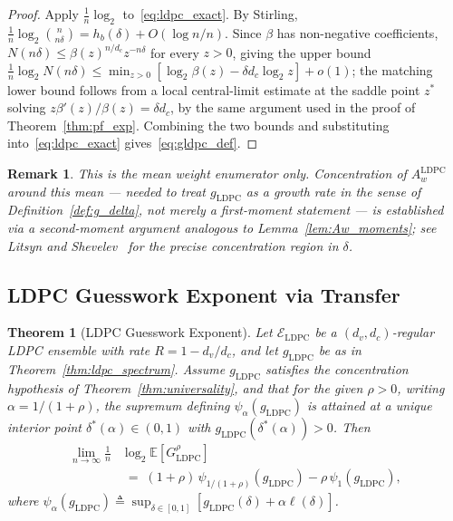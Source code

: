 \documentclass[journal,10pt,onecolumn]{IEEEtran}
\newtheorem{theorem}{Theorem}
\newtheorem{remark}{Remark}
\newcommand{\Eb}{\mathbb{E}}
\newcommand{\Hb}{h_b}
\begin{document}
\begin{proof}
Apply $\frac1n\log_2$ to~\eqref{eq:ldpc_exact}. By Stirling,
$\frac1n\log_2\binom{n}{n\delta}=\Hb(\delta)+O(\log n/n)$.
Since $\beta$ has non-negative coefficients, $N(n\delta)\le\beta(z)^{n/d_c}z^{-n\delta}$
for every $z>0$, giving the upper bound
$\frac1n\log_2 N(n\delta)\le\min_{z>0}[\log_2\beta(z)-\delta d_c\log_2 z]+o(1)$;
the matching lower bound follows from a local central-limit estimate at the
saddle point $z^*$ solving $z\beta'(z)/\beta(z)=\delta d_c$, by the same
argument used in the proof of Theorem~\ref{thm:pf_exp}. Combining the two
bounds and substituting into~\eqref{eq:ldpc_exact} gives~\eqref{eq:gldpc_def}.
\end{proof}

\begin{remark}
This is the mean weight enumerator only. Concentration of $A_w^{\mathrm{LDPC}}$
around this mean — needed to treat $g_{\mathrm{LDPC}}$ as a growth rate in the
sense of Definition~\ref{def:g_delta}, not merely a first-moment statement —
is established via a second-moment argument analogous to
Lemma~\ref{lem:Aw_moments}; see Litsyn and Shevelev~\cite{litsyn2002ensembles}
for the precise concentration region in $\delta$.
\end{remark}

\subsection{LDPC Guesswork Exponent via Transfer}

\begin{theorem}[LDPC Guesswork Exponent]
\label{thm:ldpc_guesswork}
Let $\mathcal{E}_{\mathrm{LDPC}}$ be a $(d_v,d_c)$-regular LDPC ensemble with
rate $R=1-d_v/d_c$, and let $g_{\mathrm{LDPC}}$ be as in
Theorem~\ref{thm:ldpc_spectrum}. Assume $g_{\mathrm{LDPC}}$ satisfies the
concentration hypothesis of Theorem~\ref{thm:universality}, and that for the
given $\rho>0$, writing $\alpha=1/(1+\rho)$, the supremum defining
$\psi_\alpha(g_{\mathrm{LDPC}})$ is attained at a unique interior point
$\delta^*(\alpha)\in(0,1)$ with $g_{\mathrm{LDPC}}(\delta^*(\alpha))>0$.
Then
\begin{align}
    \lim_{n\to\infty}\frac{1}{n} & \log_2\Eb\!\left[G_{\mathrm{LDPC}}^{\rho}\right] \nonumber \\
    &\;=\;
    (1+\rho)\,\psi_{1/(1+\rho)}(g_{\mathrm{LDPC}})
    -\rho\,\psi_1(g_{\mathrm{LDPC}}),
    \label{eq:ldpc_guesswork}
\end{align}
where $\psi_\alpha(g_{\mathrm{LDPC}})\triangleq\sup_{\delta\in[0,1]}
[g_{\mathrm{LDPC}}(\delta)+\alpha\ell(\delta)]$.
\end{theorem}
\end{document}
